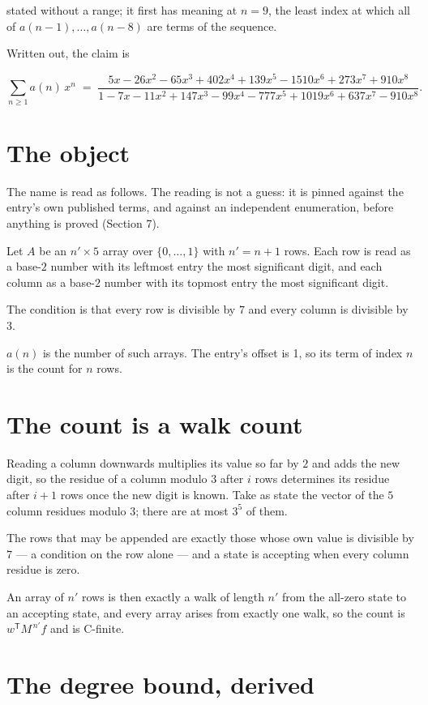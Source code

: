 \documentclass[11pt]{article}
\theoremstyle{definition}
\begin{document}
stated without a range; it first has meaning at $n = 9$, the least index at which all of $a(n-1),\dots,a(n-8)$ are terms of the sequence.

Written out, the claim is

\[\sum_{n \ge 1} a(n)\,x^n \;=\; \frac{5x - 26x^{2} - 65x^{3} + 402x^{4} + 139x^{5} - 1510x^{6} + 273x^{7} + 910x^{8}}{1 - 7x - 11x^{2} + 147x^{3} - 99x^{4} - 777x^{5} + 1019x^{6} + 637x^{7} - 910x^{8}}.\]

\section{The object}

The name is read as follows. The reading is not a guess: it is pinned against the entry's own published terms, and against an independent enumeration, before anything is proved (Section 7).

Let $A$ be an $n' \times 5$ array over $\{0,\dots,1\}$ with $n' = n + 1$ rows. Each row is read as a base-$2$ number with its leftmost entry the most significant digit, and each column as a base-$2$ number with its topmost entry the most significant digit.

The condition is that every row is divisible by $7$ and every column is divisible by $3$.

$a(n)$ is the number of such arrays. The entry's offset is 1, so its term of index $n$ is the count for $n$ rows.

\section{The count is a walk count}

Reading a column downwards multiplies its value so far by $2$ and adds the new digit, so the residue of a column modulo $3$ after $i$ rows determines its residue after $i+1$ rows once the new digit is known. Take as state the vector of the $5$ column residues modulo $3$; there are at most $3^{5}$ of them.

The rows that may be appended are exactly those whose own value is divisible by $7$ --- a condition on the row alone --- and a state is accepting when every column residue is zero.

An array of $n'$ rows is then exactly a walk of length $n'$ from the all-zero state to an accepting state, and every array arises from exactly one walk, so the count is $w^{\mathsf T}M^{\,n'}f$ and is C-finite.

\section{The degree bound, derived}
\end{document}
